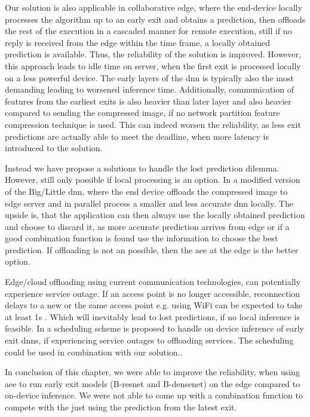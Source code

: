 Our solution is also applicable in collaborative edge, where the end-device locally processes the algorithm up to an early exit and obtains a prediction, then offloads the rest of the execution in a cascaded manner for remote execution, still if no reply is received from the edge within the time frame, a locally obtained prediction is available. Thus, the reliability of the solution is improved. However, this approach leads to idle time on server, when the first exit is processed locally on a less powerful device. The early layers of the \gls{dnn} is typically also the most demanding leading to worsened inference time. Additionally, communication of features from the earliest exits is also heavier than later layer and also heavier compared to sending the compressed image, if no network partition feature compression technique is used. This can indeed worsen the reliability, as less exit predictions are actually able to meet the deadline, when more latency is introduced to the solution.

Instead we have propose a solutions to handle the lost prediction dilemma. However, still only possible if local processing is an option. In a modified version of the Big/Little \gls{dnn}, where the end device offloads the compressed image to edge server and in parallel process a smaller and less accurate \gls{dnn} locally. The upside is, that the application can then always use the locally obtained prediction and choose to discard it, as more accurate prediction arrives from edge or if a good combination function is found use the information to choose the best prediction. If offloading is not an possible, then the \gls{aee} at the edge is the better option.

Edge/cloud offloading using current communication technologies, can potentially experience service outage. If an access point is no longer accessible, reconnection delays to a new or the same access point e.g. using WiFi can be expected to take at least 1s \cite{pei_why_2017}. Which will inevitably lead to lost predictions, if no local inference is feasible. In \cite{wang_see:_2019} a scheduling scheme is proposed to handle on device inference of early exit \gls{dnn}s, if experiencing service outages to offloading services. The scheduling could be used in combination with our solution..

In conclusion of this chapter, we were able to improve the reliability, when using \gls{aee} to run early exit models (B-\gls{resnet} and B-\gls{densenet}) on the edge compared to on-device inference. We were not able to come up with a combination function to compete with the just using the prediction from the latest exit. 
